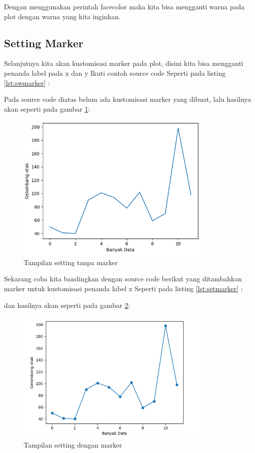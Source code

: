 Dengan menggunakan perintah facecolor maka kita bisa mengganti warna pada plot dengan warna yang kita inginkan.

\subsection{Setting Marker}
Selanjutnya kita akan kustomisasi marker pada plot, disini kita bisa mengganti penanda label pada x dan y
Ikuti contoh source code Seperti pada listing \ref{lst:swmarker} : 


Pada source code diatas belum ada kustomisasi marker yang dibuat, lalu  hasilnya akan seperti pada gambar \ref{fig:swmarker}:
\begin{figure}[!htbp]
	\centerline{\includegraphics[width=0.85\textwidth]{figures/6/swmarker.PNG}}
	\caption{Tampilan setting tanpa marker}
	\label{fig:swmarker}
\end{figure} 

Sekarang coba kita bandingkan dengan source code berikut yang ditambahkan marker untuk kustomisasi penanda label x Seperti pada listing \ref{lst:setmarker} : 

dan hasilnya akan seperti pada gambar \ref{fig:setmarker}:
\begin{figure}[!htbp]
	\centerline{\includegraphics[width=0.85\textwidth]{figures/6/setmarker.PNG}}
	\caption{Tampilan setting dengan marker}
	\label{fig:setmarker}
\end{figure} 

